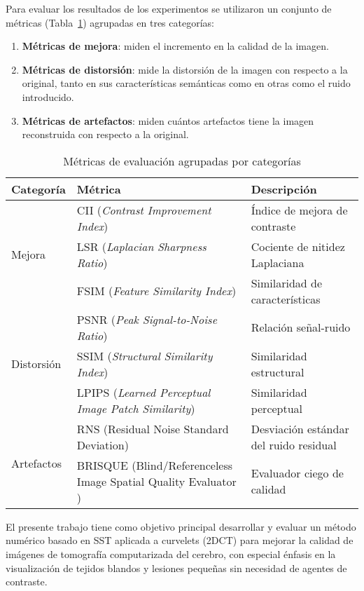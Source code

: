 Para evaluar los resultados de los experimentos se utilizaron un conjunto de métricas (Tabla~\ref{tab:metricas}) agrupadas en tres categorías:
\begin{enumerate}
    \item \textbf{Métricas de mejora}: miden el incremento en la calidad de la imagen.
    \item \textbf{Métricas de distorsión}: mide la distorsión de la imagen con respecto a la original, tanto en sus características semánticas como en otras como el ruido introducido.
    \item \textbf{Métricas de artefactos}: miden cuántos artefactos tiene la imagen reconstruida con respecto a la original.
\end{enumerate}

\begin{table}[h]
    \centering
    \caption{Métricas de evaluación agrupadas por categorías\cite{Metrics}}
    \label{tab:metricas}
    \begin{tabular}{p{3cm}p{8cm}p{3cm}}
    \toprule
    \textbf{Categoría} & \textbf{Métrica} & \textbf{Descripción} \\ 
    \midrule
    \multirow{3}{*}{Mejora} 
    & CII (\textit{Contrast Improvement Index}) & Índice de mejora de contraste \\
    & LSR (\textit{Laplacian Sharpness Ratio}) & Cociente de nitidez Laplaciana \\
    & FSIM (\textit{Feature Similarity Index}) & Similaridad de características \\
    \midrule

    \multirow{3}{*}{Distorsión}
    & PSNR (\textit{Peak Signal-to-Noise Ratio}) & Relación señal-ruido \\
    & SSIM (\textit{Structural Similarity Index}) & Similaridad estructural \\
    & LPIPS (\textit{Learned Perceptual Image Patch Similarity}) & Similaridad perceptual \\
    \midrule

    \multirow{2}{*}{Artefactos}
    & RNS (Residual Noise Standard Deviation) & Desviación estándar del ruido residual \\
    & BRISQUE (Blind/Referenceless Image Spatial Quality Evaluator \cite{BRISQUE}) & Evaluador ciego de calidad \\
    \bottomrule
    \end{tabular}
\end{table}

El presente trabajo tiene como objetivo principal desarrollar y evaluar un método numérico basado en SST aplicada a curvelets (2DCT) para mejorar la calidad de imágenes de tomografía computarizada del cerebro, con especial énfasis en la visualización de tejidos blandos y lesiones pequeñas sin necesidad de agentes de contraste.

